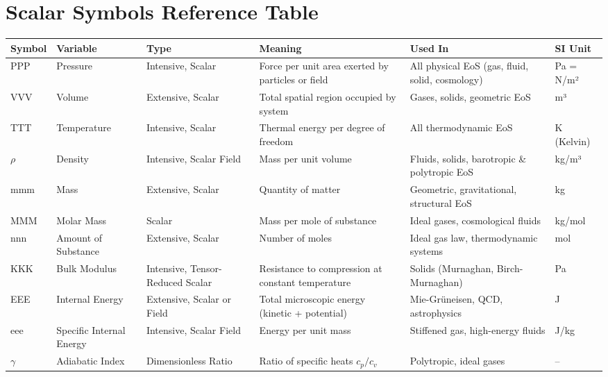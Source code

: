 \documentclass{article}
\begin{document}
\section*{Scalar Symbols Reference Table}

\begin{longtable}{|>{\raggedright\arraybackslash}p{1.2cm}
                  |>{\raggedright\arraybackslash}p{2.6cm}
                  |>{\raggedright\arraybackslash}p{2.8cm}
                  |>{\raggedright\arraybackslash}p{3.7cm}
                  |>{\raggedright\arraybackslash}p{3.7cm}
                  |>{\raggedright\arraybackslash}p{2.0cm}|}
\hline
\rowcolor{black!20}
\textbf{Symbol} & \textbf{Variable} & \textbf{Type} & \textbf{Meaning} & \textbf{Used In} & \textbf{SI Unit} \\
\hline
PPP & Pressure & Intensive, Scalar & Force per unit area exerted by particles or field & All physical EoS (gas, fluid, solid, cosmology) & Pa = N/m² \\
VVV & Volume & Extensive, Scalar & Total spatial region occupied by system & Gases, solids, geometric EoS & m³ \\
TTT & Temperature & Intensive, Scalar & Thermal energy per degree of freedom & All thermodynamic EoS & K (Kelvin) \\
$\rho$ & Density & Intensive, Scalar Field & Mass per unit volume & Fluids, solids, barotropic \& polytropic EoS & kg/m³ \\
mmm & Mass & Extensive, Scalar & Quantity of matter & Geometric, gravitational, structural EoS & kg \\
MMM & Molar Mass & Scalar & Mass per mole of substance & Ideal gases, cosmological fluids & kg/mol \\
nnn & Amount of Substance & Extensive, Scalar & Number of moles & Ideal gas law, thermodynamic systems & mol \\
KKK & Bulk Modulus & Intensive, Tensor-Reduced Scalar & Resistance to compression at constant temperature & Solids (Murnaghan, Birch-Murnaghan) & Pa \\
EEE & Internal Energy & Extensive, Scalar or Field & Total microscopic energy (kinetic + potential) & Mie-Grüneisen, QCD, astrophysics & J \\
eee & Specific Internal Energy & Intensive, Scalar Field & Energy per unit mass & Stiffened gas, high-energy fluids & J/kg \\
$\gamma$ & Adiabatic Index & Dimensionless Ratio & Ratio of specific heats $c_p/c_v$ & Polytropic, ideal gases & – \\

\end{longtable}
\end{document}
